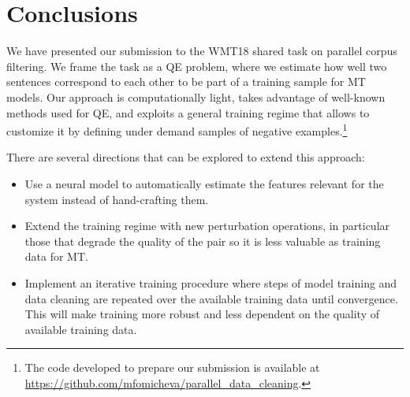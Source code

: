 \section{Conclusions}
We have presented our submission to the WMT18 shared task on parallel corpus filtering. We frame the task as a QE problem, where we estimate how well two sentences correspond to each other to be part of a training sample for MT models. Our approach is computationally light, takes advantage of well-known methods used for QE, and exploits a general training regime that allows to customize it by defining under demand samples of negative examples.\footnote{The code developed to prepare our submission is available at \url{https://github.com/mfomicheva/parallel_data_cleaning}.}

There are several directions that can be explored to extend this approach:
\begin{itemize}
\item Use a neural model to automatically estimate the features relevant for the system instead of hand-crafting them.
\item Extend the training regime with new perturbation operations, in particular those that degrade the quality of the pair so it is less valuable as training data for MT.
\item Implement an iterative training procedure where steps of model training and data cleaning are repeated over the available training data until convergence. This will make training more robust and less dependent on the quality of available training data.
\end{itemize}